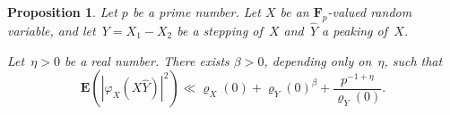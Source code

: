 \documentclass[12pt]{amsart}
\renewcommand{\geq}{\geqslant}
\numberwithin{equation}{section}
\newcommand{\Ff}{\mathbf{F}}
\newcommand{\proba}{\mathbf{P}}
\newcommand{\expect}{\mathbf{E}}
\renewcommand{\rho}{\varrho}
\theoremstyle{plain}
\newtheorem{proposition}[theorem]{Proposition}
\theoremstyle{remark}
\theoremstyle{definition}
\renewcommand{\geq}{\geqslant}
\begin{document}



\begin{proposition}\label{pr-alt-1}
  Let $p$ be a prime number. Let $X$ be an $\Ff_p$-valued random
  variable, and let~$Y=X_1-X_2$ be a stepping of~$X$ and~$\widehat{Y}$ a
  peaking of~$X$.

  Let~$\eta>0$ be a real number. There exists $\beta>0$, depending
  only on~$\eta$, such that
  \begin{equation}\label{eq-estimate}
    \expect(|\varphi_X(X\widehat{Y})|^2)\ll
    \rho_X(0)+\rho_Y(0)^{\beta}+
    \frac{p^{-1+\eta}}{\rho_Y(0)}.
  \end{equation}
\end{proposition}
\end{document}
